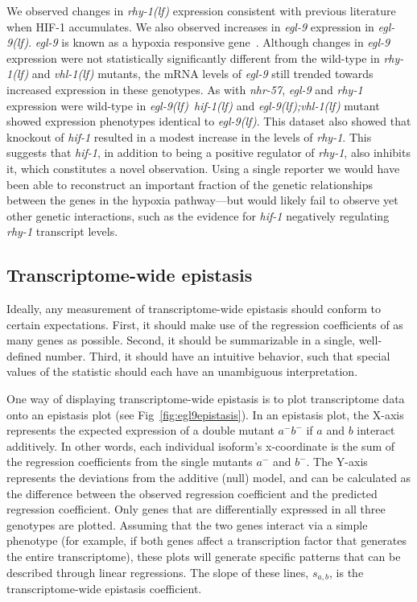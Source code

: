 \documentclass[10pt, onecolumn]{article}
\newcommand{\gene}[1]{\emph{#1}}
\newcommand{\nhr}{\emph{\mbox{nhr-57}}}
\newcommand{\egl}{\emph{\mbox{egl-9}(lf)}}
\newcommand{\rhy}{\emph{\mbox{rhy-1}(lf)}}
\newcommand{\vhl}{\emph{\mbox{vhl-1}(lf)}}
\newcommand{\eglvhl}{\emph{\mbox{egl-9(lf);vhl-1(lf)}}}
\newcommand{\eglhif}{\emph{\mbox{egl-9(lf)}~\mbox{hif-1(lf)}}}
\newcommand{\hifp}{HIF-1}
\begin{document}
We observed changes in \rhy{} expression consistent with previous
literature~\cite{Shen2006} when \hifp{} accumulates.
We also observed increases in \gene{egl-9} expression in \egl{}.
\gene{egl-9} is known as a hypoxia responsive gene~\cite{Powell-Coffman2010}.
Although changes in \gene{egl-9} expression were not statistically significantly
different from the wild-type in
\rhy{} and \vhl{} mutants, the mRNA levels of \gene{egl-9} still trended towards
increased expression in these genotypes.
As with \nhr{}, \gene{egl-9} and \gene{rhy-1} expression were wild-type in
\eglhif{} and \eglvhl{} mutant showed expression phenotypes identical to \egl{}.
This dataset also showed that knockout of \gene{hif-1} resulted in a modest
increase in the levels of \gene{rhy-1}. This suggests that \gene{hif-1}, in
addition to being a positive regulator of \gene{rhy-1}, also inhibits it, which
constitutes a novel observation.
Using a single reporter we would have been able to reconstruct an
important fraction of the genetic relationships between the genes in the hypoxia
pathway–--but would likely fail to observe yet other genetic interactions, such as
the evidence for \gene{hif-1} negatively regulating \gene{rhy-1} transcript levels.


\subsection*{Transcriptome-wide epistasis}
Ideally, any measurement of transcriptome-wide epistasis should conform to certain
expectations. First, it should make use of the regression coefficients of as
many genes as possible. Second, it should be summarizable in a single,
well-defined number. Third, it should have an intuitive behavior, such that
special values of the statistic should each have an unambiguous interpretation.

One way of displaying transcriptome-wide epistasis is to plot transcriptome data onto
an epistasis plot (see Fig~\ref{fig:egl9epistasis}). In an epistasis plot, the
X-axis represents the expected expression of a double mutant $a^-b^-$ if $a$
and $b$ interact additively.
In other words, each individual isoform's x-coordinate is the sum of the regression
coefficients from the single mutants $a^-$ and $b^-$.
The Y-axis represents the deviations from the additive (null) model, and
can be calculated as the difference between the observed regression coefficient
and the predicted regression coefficient. Only genes that are differentially
expressed in all three genotypes are plotted. Assuming that the two genes interact
via a simple phenotype (for example, if both genes affect a transcription factor
that generates the entire transcriptome), these plots will generate specific
patterns that can be described through linear regressions. The slope of these
lines, $s_{a,b}$, is the transcriptome-wide epistasis coefficient.
\end{document}
